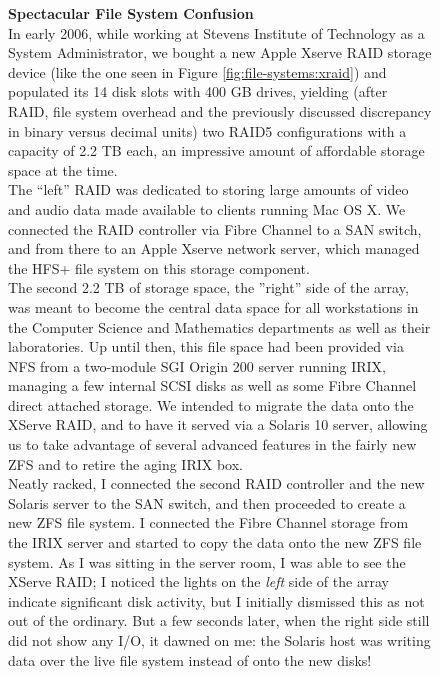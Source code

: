 \begin{figure}
\begin{experience}
{\bf Spectacular File System Confusion} \\

In early 2006, while working at Stevens Institute of
Technology as a System Administrator, we bought a new
Apple Xserve RAID storage device (like the one seen in
Figure \ref{fig:file-systems:xraid}) and populated its
14 disk slots with 400 GB drives, yielding (after
RAID, file system overhead and the previously
discussed discrepancy in binary versus decimal units)
two RAID5 configurations with a capacity of 2.2 TB
each, an impressive amount of affordable storage space
at the time. \\ [10pt]

The ``left'' RAID was dedicated to storing large
amounts of video and audio data made available to
clients running Mac OS X.  We connected the RAID
controller via Fibre Channel to a SAN switch, and from
there to an Apple Xserve network server, which managed
the HFS+ file system on this storage component. \\
[10pt]

The second 2.2 TB of storage space, the ''right'' side
of the array, was meant to become the central data
space for all workstations in the Computer Science and
Mathematics departments as well as their laboratories.
Up until then, this file space had been provided via
NFS from a two-module SGI Origin 200 server running
IRIX, managing a few internal SCSI disks as well
as some Fibre Channel direct attached storage.  We
intended to migrate the data onto the XServe RAID, and
to have it served via a Solaris 10 server, allowing us
to take advantage of several advanced features in the
fairly new ZFS and to retire the aging IRIX box.  \\
[10pt]

Neatly racked, I connected the second RAID controller
and the new Solaris server to the SAN switch, and then
proceeded to create a new ZFS file system.  I
connected the Fibre Channel storage from the IRIX
server and started to copy the data onto the new ZFS
file system.  As I was sitting in the server room, I
was able to see the XServe RAID; I noticed the lights
on the {\em left} side of the array indicate
significant disk activity, but I initially dismissed
this as not out of the ordinary.  But a few seconds
later, when the right side still did not show any I/O,
it dawned on me: the Solaris host was writing data
over the live file system instead of onto the new
disks!
\end{experience}
\end{figure}
